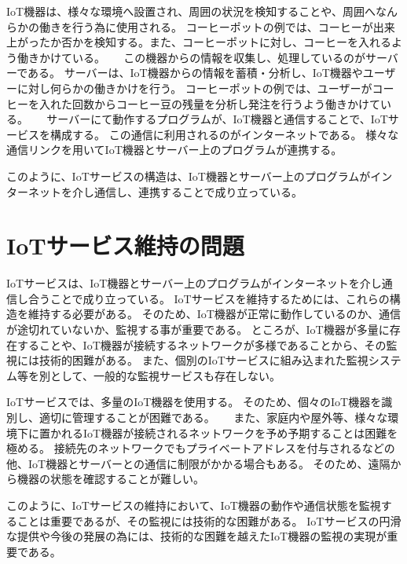 IoT機器は、様々な環境へ設置され、周囲の状況を検知することや、周囲へなんらかの働きを行う為に使用される。
コーヒーポットの例では、コーヒーが出来上がったか否かを検知する。また、コーヒーポットに対し、コーヒーを入れるよう働きかけている。
　
この機器からの情報を収集し、処理しているのがサーバーである。
サーバーは、IoT機器からの情報を蓄積・分析し、IoT機器やユーザーに対し何らかの働きかけを行う。
コーヒーポットの例では、ユーザーがコーヒーを入れた回数からコーヒー豆の残量を分析し発注を行うよう働きかけている。
　
サーバーにて動作するプログラムが、IoT機器と通信することで、IoTサービスを構成する。
この通信に利用されるのがインターネットである。
様々な通信リンクを用いてIoT機器とサーバー上のプログラムが連携する。

このように、IoTサービスの構造は、IoT機器とサーバー上のプログラムがインターネットを介し通信し、連携することで成り立っている。

\section{IoTサービス維持の問題}
IoTサービスは、IoT機器とサーバー上のプログラムがインターネットを介し通信し合うことで成り立っている。
IoTサービスを維持するためには、これらの構造を維持する必要がある。
そのため、IoT機器が正常に動作しているのか、通信が途切れていないか、監視する事が重要である。
ところが、IoT機器が多量に存在することや、IoT機器が接続するネットワークが多様であることから、その監視には技術的困難がある。
また、個別のIoTサービスに組み込まれた監視システム等を別として、一般的な監視サービスも存在しない。

IoTサービスでは、多量のIoT機器を使用する。
そのため、個々のIoT機器を識別し、適切に管理することが困難である。
　
また、家庭内や屋外等、様々な環境下に置かれるIoT機器が接続されるネットワークを予め予期することは困難を極める。
接続先のネットワークでもプライベートアドレスを付与されるなどの他、IoT機器とサーバーとの通信に制限がかかる場合もある。
そのため、遠隔から機器の状態を確認することが難しい。

このように、IoTサービスの維持において、IoT機器の動作や通信状態を監視することは重要であるが、その監視には技術的な困難がある。
IoTサービスの円滑な提供や今後の発展の為には、技術的な困難を越えたIoT機器の監視の実現が重要である。



